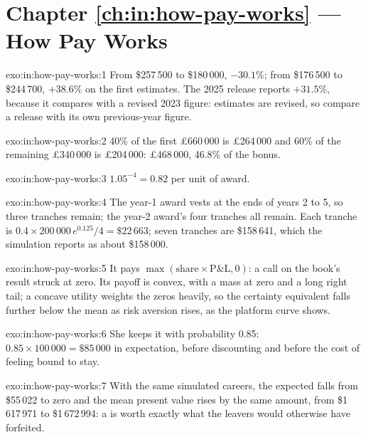 \section*{Chapter \ref{ch:in:how-pay-works} --- How Pay Works}

\begin{solution}{exo:in:how-pay-works:1}
From \$257\,500 to \$180\,000, $-30.1\%$; from \$176\,500 to \$244\,700, $+38.6\%$ on the first estimates. The 2025
release reports $+31.5\%$, because it compares with a revised 2023 figure: estimates are revised, so compare a release
with its own previous-year figure.
\end{solution}

\begin{solution}{exo:in:how-pay-works:2}
40\% of the first \pounds660\,000 is \pounds264\,000 and 60\% of the remaining \pounds340\,000 is \pounds204\,000:
\pounds468\,000, 46.8\% of the bonus.
\end{solution}

\begin{solution}{exo:in:how-pay-works:3}
$1.05^{-4}=0.82$ per unit of award.
\end{solution}

\begin{solution}{exo:in:how-pay-works:4}
The year-1 award vests at the ends of years 2 to 5, so three tranches remain; the year-2 award's four tranches all
remain. Each tranche is $0.4\times200\,000\,e^{0.125}/4=\$22\,663$; seven tranches are \$158\,641, which the simulation
reports as about \$158\,000.
\end{solution}

\begin{solution}{exo:in:how-pay-works:5}
It pays $\max(\text{share}\times\text{P\&L},0)$: a call on the book's result struck at zero. Its payoff is convex, with a
mass at zero and a long right tail; a concave utility weights the zeros heavily, so the certainty equivalent falls
further below the mean as risk aversion rises, as the platform curve shows.
\end{solution}

\begin{solution}{exo:in:how-pay-works:6}
She keeps it with probability 0.85: $0.85\times100\,000=\$85\,000$ in expectation, before discounting and before the
cost of feeling bound to stay.
\end{solution}

\begin{solution}{exo:in:how-pay-works:7}
With the same simulated careers, the expected  falls from \$55\,022 to zero and the mean present value rises by
the same amount, from \$1\,617\,971 to \$1\,672\,994: a  is worth exactly what the leavers would
otherwise have forfeited.
\end{solution}

